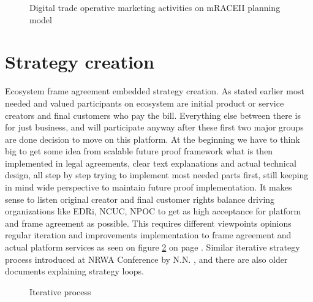 \begin{figure} %
 \begin{center}
  \caption{Digital trade operative marketing activities on mRACEII planning model}
  \label{fig:mRACEII}
 \end{center}
\end{figure}

\section{Strategy creation}
\label{strategy_creation}
Ecosystem frame agreement embedded strategy creation.
As stated earlier most needed and valued participants on ecosystem are initial product or service creators and final customers who pay the bill. Everything else between there is for just business, and will participate anyway after these first two major groups are done decision to move on this platform. At the beginning we have to think big to get some idea from scalable future proof framework what is then implemented in legal agreements, clear text explanations and actual technical design, all step by step trying to implement most needed parts first, still keeping in mind wide perspective to maintain future proof implementation. It makes sense to listen original creator and final customer rights balance driving organizations like EDRi, NCUC, NPOC to get as high acceptance for platform and frame agreement as possible. This requires different viewpoints opinions regular iteration and improvements implementation to frame agreement and actual platform services as seen on figure \ref{fig:iteration} on page \pageref{fig:iteration}. Similar iterative strategy process introduced at NRWA Conference by N.N. \cite{NNlostAtNRWC2022}, and there are also older documents explaining strategy loops.

\begin{figure} %
 \begin{center}
  \caption{Iterative process}
  \label{fig:iteration}
 \end{center}
\end{figure}

